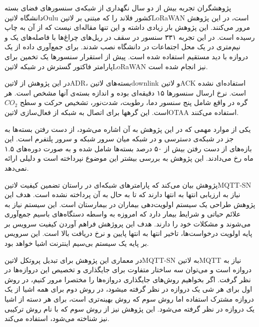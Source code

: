
پژوهشگران  تجربه بیش از دو سال نگهداری از شبکه‌ی سنسورهای فضای بسته دانشگاه ‌لاتین{Oulu} کشور فلاند را
که مبتنی بر ‌لاتین{LoRaWAN} است، در این پژوهش مرور می‌کنند.
این پژوهش بار زیادی داشته و این تنها مقاله‌ای نیست که از آن به چاپ رسیده است. در این تجربه ۳۳۱ سنسور در سقف در ریل‌های چراغ‌ها با فاصله‌های یک و نیم‌متری در یک محل اجتماعات در دانشگاه نصب شدند.
برای جمع‌آوری داده از یک دروازه با دید مستقیم استفاده شده است. پیش از استقرار سنسورها یک تخمین برای پارامتر فاکتور گسترش در شبکه ‌لاتین{LoRaWAN} نیز انجام شده است.

در این پژوهش ‌از ‌لاتین{ADR}، بسته‌های ‌لاتین{downlink} و ‌لاتین{ACK} استفاده‌ای نشده است. نرخ ارسال سنسورها ۱۵ دقیقه‌ای بوده و اندازه بسته‌ی آنها مشخص است.
هر گره در واقع شامل پنج سنسور دما، رطوبت، شدت‌نور، تشخیص حرکت و سطح $CO_{2}$ است. این گرهها برای اتصال به شبکه از فعال‌سازی ‌لاتین{OTAA} استفاده می‌کنند.

یکی از موارد مهمی که در این پژوهش به آن اشاره می‌شود، از دست رفتن بسته‌ها به جز در شبکه‌ی دسترسی و در
شبکه میان سرور شبکه و سرور پلتفرم است.
این بازه‌های از دست رفتن بیش از ۵۰ درصد بسته‌ها شامل شده و به صورت دوره‌های ۱.۵ ماه رخ می‌دادند. این پژوهش به بررسی بیشتر این موضوع نپرداخته است و دلیلی ارائه نمی‌دهد.



پژوهش  بیان می‌کند که پارامترهای شبکه‌ای در راستان تضمین کیفیت ‌لاتین{MQTT-SN} نیاز به ارزیابی
انتها به انتها دارند که تا به حال به آن پرداخته نشده است.
هدف این پژوهش طراحی یک سیستم اولویت‌دهی بیماران در بیمارستان است. این سیستم نیاز به علائم حیاتی و شرایط بیمار دارد که
امروزه به واسطه دستگاه‌های باسیم جمع‌آوری می‌شوند و مشکلات خود را دارند.
هدف این پروژهش فراهم آوردن کیفیت سرویس بر پایه اولویت درخواست‌ها، تاخیر انتها به انتها پایین و نرخ دریافت بالا است.
این سرویس بر پایه یک سیستم بی‌سیم اینترنت اشیا خواهد بود.

در معماری این پژوهش برای تبدیل پروتکل ‌لاتین{MQTT-SN} به ‌لاتین{MQTT} نیاز به دروازه است و
می‌توان سه ساختار متفاوت برای جایگذاری و تخصیص این دروازه‌ها در نظر گرفت.
اگر بخواهیم روش‌های جایگذاری دروازه‌ها را مختصرا مرور کنیم،
در روش اول برای هر شی یک دروازه در نظر گرفته میشود، در روش دوم برای همه اشیا از یک دروازه
مشترک استفاده اما روش سوم که روش بهینه‌تری است، برای هر دسته از اشیا یک دروازه در نظر گرفته می‌شود.
این پژوهش نیز از روش سوم که با نام روش ترکیبی نیز شناخته می‌شود، استفاده می‌کند.

